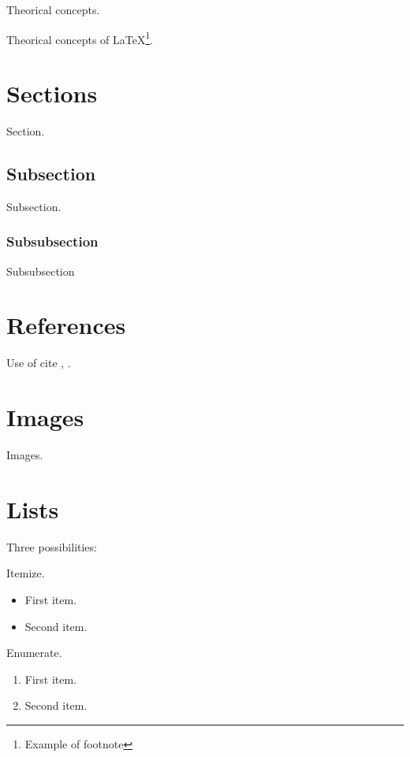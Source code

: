 
\nonzeroparskip Theorical concepts.

Theorical concepts of \LaTeX \footnote{Example of footnote}.

\section{Sections}

Section.

\subsection{Subsection}

Subsection.

\subsubsection{Subsubsection}

Subsubsection


\section{References}

Use of cite \cite{wiki:latex}, \cite{koza92}.


\section{Images}

Images.




\section{Lists}

Three possibilities:

Itemize.
\begin{itemize}
	\item First item.
	\item Second item.
\end{itemize}

Enumerate.
\begin{enumerate}
	\item First item.
	\item Second item.
\end{enumerate}

